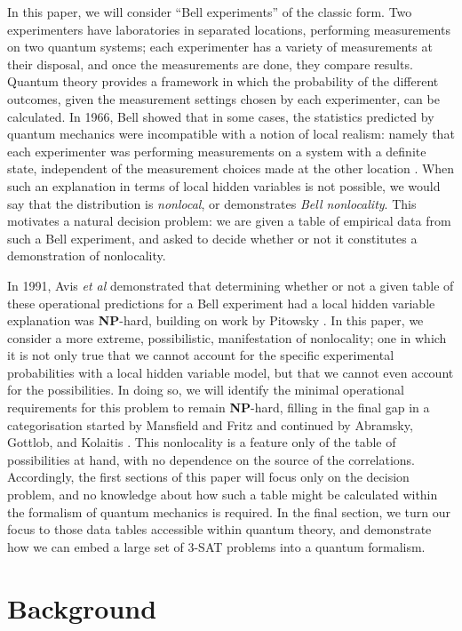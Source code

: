 \documentclass[reprint]{revtex4-1}
\theoremstyle{definition}
\begin{document}
In this paper, we will consider ``Bell experiments'' of the classic form. Two experimenters have laboratories in separated locations, performing measurements on two quantum systems; each experimenter has a variety of measurements at their disposal, and once the measurements are done, they compare results. Quantum theory provides a framework in which the probability of the different outcomes, given the measurement settings chosen by each experimenter, can be calculated. In 1966, Bell showed that in some cases, the statistics predicted by quantum mechanics were incompatible with a notion of local realism: namely that each experimenter was performing measurements on a system with a definite state, independent of the measurement choices made at the other location \cite{Bell1966}. When such an explanation in terms of local hidden variables is not possible, we would say that the distribution is \emph{nonlocal}, or demonstrates \emph{Bell nonlocality}. This motivates a natural decision problem: we are given a table of empirical data from such a Bell experiment, and asked to decide whether or not it constitutes a demonstration of nonlocality. 

In 1991, Avis \emph{et al} \cite{Avis2004} demonstrated that determining whether or not a given table of these operational predictions for a Bell experiment had a local hidden variable explanation was \textbf{NP}-hard, building on work by Pitowsky \cite{Pito1991}. In this paper, we consider a more extreme, possibilistic, manifestation of nonlocality; one in which it is not only true that we cannot account for the specific experimental probabilities with a local hidden variable model, but that we cannot even account for the possibilities. In doing so, we will identify the minimal operational requirements for this problem to remain \textbf{NP}-hard, filling in the final gap in a categorisation started by Mansfield and Fritz \cite{Mans2011,Mans2017} and continued by Abramsky, Gottlob, and Kolaitis \cite{Abra2013}. This nonlocality is a feature only of the table of possibilities at hand, with no dependence on the source of the correlations. Accordingly, the first sections of this paper will focus only on the decision problem, and no knowledge about how such a table might be calculated within the formalism of quantum mechanics is required. In the final section, we turn our focus to those data tables accessible within quantum theory, and demonstrate how we can embed a large set of \textsc{3-SAT} problems into a quantum formalism.


\section{Background}
\end{document}
